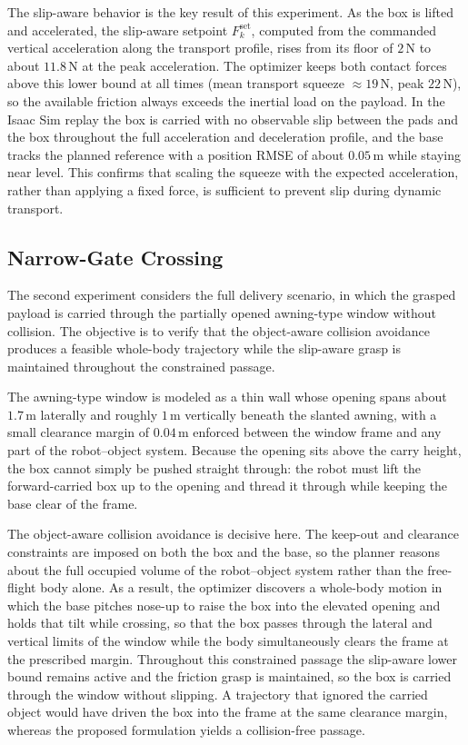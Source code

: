 \documentclass[letterpaper, 10 pt, conference]{ieeeconf}  %
\begin{document}
The slip-aware behavior is the key result of this experiment. As the box is lifted and accelerated, the slip-aware setpoint $F^{\mathrm{set}}_k$, computed from the commanded vertical acceleration along the transport profile, rises from its floor of $2\,\mathrm{N}$ to about $11.8\,\mathrm{N}$ at the peak acceleration. The optimizer keeps both contact forces above this lower bound at all times (mean transport squeeze $\approx 19\,\mathrm{N}$, peak $22\,\mathrm{N}$), so the available friction always exceeds the inertial load on the payload. In the Isaac Sim replay the box is carried with no observable slip between the pads and the box throughout the full acceleration and deceleration profile, and the base tracks the planned reference with a position RMSE of about $0.05\,\mathrm{m}$ while staying near level. This confirms that scaling the squeeze with the expected acceleration, rather than applying a fixed force, is sufficient to prevent slip during dynamic transport.

\subsection{Narrow-Gate Crossing}
The second experiment considers the full delivery scenario, in which the grasped payload is carried through the partially opened awning-type window without collision.
The objective is to verify that the object-aware collision avoidance produces a feasible whole-body trajectory while the slip-aware grasp is maintained throughout the constrained passage.

The awning-type window is modeled as a thin wall whose opening spans about $1.7\,\mathrm{m}$ laterally and roughly $1\,\mathrm{m}$ vertically beneath the slanted awning, with a small clearance margin of $0.04\,\mathrm{m}$ enforced between the window frame and any part of the robot--object system. Because the opening sits above the carry height, the box cannot simply be pushed straight through: the robot must lift the forward-carried box up to the opening and thread it through while keeping the base clear of the frame.

The object-aware collision avoidance is decisive here. The keep-out and clearance constraints are imposed on both the box and the base, so the planner reasons about the full occupied volume of the robot--object system rather than the free-flight body alone. As a result, the optimizer discovers a whole-body motion in which the base pitches nose-up to raise the box into the elevated opening and holds that tilt while crossing, so that the box passes through the lateral and vertical limits of the window while the body simultaneously clears the frame at the prescribed margin. Throughout this constrained passage the slip-aware lower bound remains active and the friction grasp is maintained, so the box is carried through the window without slipping. A trajectory that ignored the carried object would have driven the box into the frame at the same clearance margin, whereas the proposed formulation yields a collision-free passage.
\end{document}
